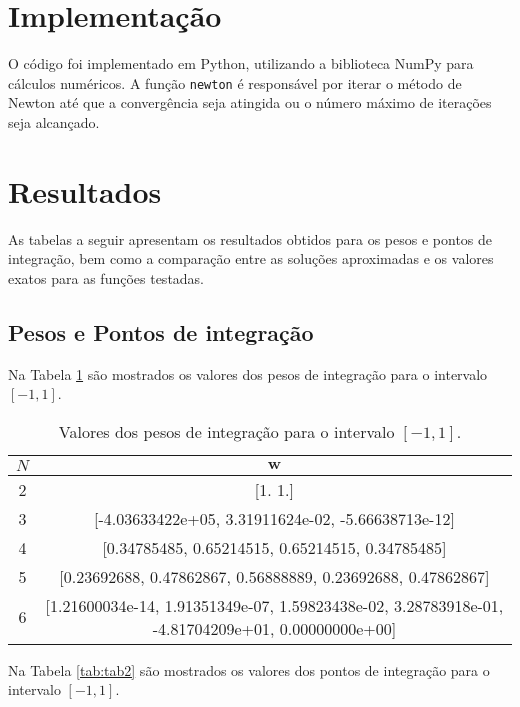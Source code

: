 \documentclass[12pt,letterpaper]{article}
\begin{document}
\section{Implementação}
O código foi implementado em Python, utilizando a biblioteca NumPy para cálculos numéricos. A função \texttt{newton} é responsável por iterar o método de Newton até que a convergência seja atingida ou o número máximo de iterações seja alcançado.

\section{Resultados}

As tabelas a seguir apresentam os resultados obtidos para os pesos e pontos de integração, bem como a comparação entre as soluções aproximadas e os valores exatos para as funções testadas.

\subsection{Pesos e Pontos de integração}

Na Tabela \ref{tab:tab1} são mostrados os valores dos pesos de integração para o intervalo \([-1, 1]\).

    \begin{table}[ht!]
        \centering
        \caption{Valores dos pesos de integração para o intervalo $[-1, 1]$.}
        \small
        \begin{tabular}{|c|c|}
        \hline
          $N$  & $\mathbf{w}$ \\ \hline
           2 & [1. 1.] \\ \hline
           3 & [-4.03633422e+05, 3.31911624e-02, -5.66638713e-12] \\ \hline
           4 & [0.34785485, 0.65214515, 0.65214515, 0.34785485] \\ \hline 
           5 & [0.23692688, 0.47862867, 0.56888889, 0.23692688, 0.47862867]  \\ \hline
           6 & [1.21600034e-14, 1.91351349e-07, 1.59823438e-02, 3.28783918e-01, -4.81704209e+01, 0.00000000e+00]  \\ \hline
        \end{tabular}
        \label{tab:tab1}
    \end{table}

Na Tabela \ref{tab:tab2} são mostrados os valores dos pontos de integração para o intervalo \([-1, 1]\). 
\end{document}
